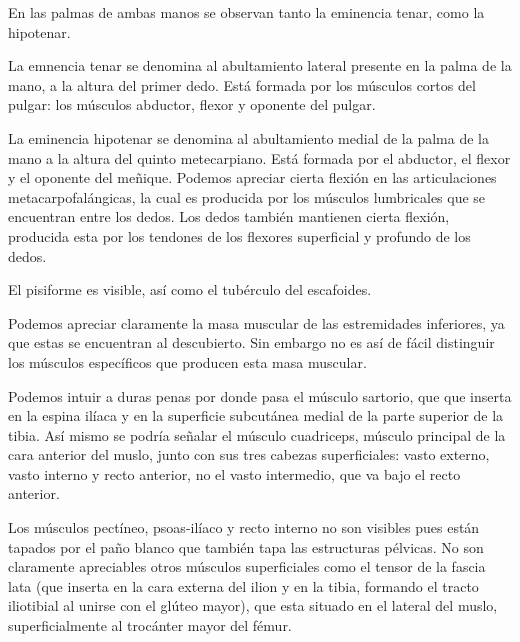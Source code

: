 En las palmas de ambas manos se observan tanto la eminencia tenar, como la hipotenar.

La emnencia tenar se denomina al abultamiento lateral presente en la palma de la mano, a la altura del primer dedo. Está formada por los músculos cortos del pulgar: los músculos abductor, flexor y oponente del pulgar.

La eminencia hipotenar se denomina al abultamiento medial de la palma de la mano a la altura del quinto metecarpiano. Está formada por el abductor, el flexor y el oponente del meñique.
Podemos apreciar cierta flexión en las articulaciones metacarpofalángicas, la cual es producida por los músculos lumbricales que se encuentran entre los dedos. Los dedos también mantienen cierta flexión, producida esta por los tendones de los flexores superficial y profundo de los dedos.

El pisiforme es visible, así como el tubérculo del escafoides.

\vspace{12pt}

Podemos apreciar claramente la masa muscular de las estremidades inferiores, ya que estas se encuentran al descubierto. Sin embargo no es así de fácil distinguir los músculos específicos que producen esta masa muscular.

Podemos intuir a duras penas por donde pasa el músculo sartorio, que que inserta en la espina ilíaca y en la superficie subcutánea medial de la parte superior de la tibia. Así mismo se podría señalar el músculo cuadriceps, músculo principal de la cara anterior del muslo, junto con sus tres cabezas superficiales: vasto externo, vasto interno y recto anterior, no el vasto intermedio, que va bajo el recto anterior.

Los músculos pectíneo, psoas-ilíaco y recto interno no son visibles pues están tapados por el paño blanco que también tapa las estructuras pélvicas. No son claramente apreciables otros músculos superficiales como el tensor de la fascia lata (que inserta en la cara externa del ilion y en la tibia, formando el tracto iliotibial al unirse con el glúteo mayor), que esta situado en el lateral del muslo, superficialmente al trocánter mayor del fémur.


